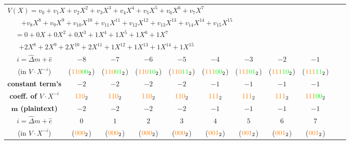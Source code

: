\begin{enumerate}
\begin{table}[h]
\centering
\footnotesize
\begin{tabular}{|c||c|c|c|c|c|c|c|c|c|c|} %
\hline
\multicolumn{10}{|l|}{$V(X) = v_0 + v_1X + v_2X^2 + v_3X^3 + v_4X^4 + v_5X^5 + v_6X^6 + v_7X^7$}  \\ 
\multicolumn{10}{|l|}{\textcolor{white}{......} $ + v_8X^8 + v_9X^9 + v_{10}X^{10} + v_{11}X^{11} + v_{12}X^{12} + v_{13}X^{13} + v_{14}X^{14} + v_{15}X^{15}$}  \\ 
\multicolumn{10}{|l|}{\textcolor{white}{....}$= 0 + 0X +0X^2 +0X^3 +1X^4 +1X^5 +1X^6 +1X^7$}  \\ 
\multicolumn{10}{|l|}{\textcolor{white}{......}$+ 2X^8  + 2X^9 + 2X^{10} + 2X^{11} + 1X^{12} + 1X^{13} + 1X^{14} + 1X^{15}$} \\ 
\hline
\hline
\textbf{\boldmath$i = \hat{\Delta}m + \hat{e}$} & $-8$ & $-7$ & $-6$ & $-5$ & $-4$ & $-3$ & $-2$ & $-1$ \\
(in $V \cdot X^{-i}$) & ($\textcolor{orange}{110}\textcolor{green}{00}_2$) & ($\textcolor{orange}{110}\textcolor{green}{01}_2$) & ($\textcolor{orange}{110}\textcolor{green}{10}_2$) & ($\textcolor{orange}{110}\textcolor{green}{11}_2$) & ($\textcolor{orange}{111}\textcolor{green}{00}_2$) & ($\textcolor{orange}{111}\textcolor{green}{01}_2$) & ($\textcolor{orange}{111}\textcolor{green}{10}_2$) & ($\textcolor{orange}{111}\textcolor{green}{11}_2$)\\
\hline
\textbf{constant term's} & $-2$ & $-2$ & $-2$ & $-2$ & $-1$ & $-1$ & $-1$ & $-1$ \\
 \textbf{coeff. of $V\cdot X^{-i}$}& $\textcolor{orange}{110}_2$ & $\textcolor{orange}{110}_2$ & $\textcolor{orange}{110}_2$ & $\textcolor{orange}{110}_2$ & $\textcolor{orange}{111}_2$ & $\textcolor{orange}{111}_2$ & $\textcolor{orange}{111}_2$ & $\textcolor{orange}{111}\textcolor{green}{00}_2$ \\
\hline
\textbf{$\bm{m}$ (plaintext)} & $-2$ & $-2$ & $-2$ & $-2$ & $-1$ & $-1$ & $-1$ & $-1$ \\
\hline
\hline
\textbf{\boldmath$i = \hat{\Delta}m + \hat{e}$} & $0$ & $1$ & $2$ & $3$ & $4$ & $5$ & $6$ & $7$ \\
(in $V \cdot X^{-i}$) & ($\textcolor{orange}{000}_2$)& ($\textcolor{orange}{000}_2$)& ($\textcolor{orange}{000}_2$)& ($\textcolor{orange}{000}_2$)& ($\textcolor{orange}{001}_2$)& ($\textcolor{orange}{001}_2$)& ($\textcolor{orange}{001}_2$)&($\textcolor{orange}{001}_2$)\\

\end{tabular}
\end{table}
\end{enumerate}
